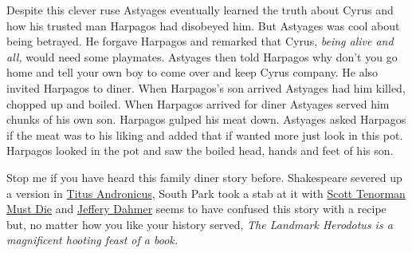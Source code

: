 Despite this clever ruse Astyages eventually learned the truth about
Cyrus and how his trusted man Harpagos had disobeyed him. But Astyages
was cool about being betrayed. He forgave Harpagos and remarked that
Cyrus, \emph{being alive and all,} would need some playmates. Astyages
then told Harpagos why don't you go home and tell your own boy to come
over and keep Cyrus company. He also invited Harpagos to diner. When
Harpagos's son arrived Astyages had him killed, chopped up and boiled.
When Harpagos arrived for diner Astyages served him chunks of his own
son. Harpagos gulped his meat down. Astyages asked Harpagos if the meat
was to his liking and added that if wanted more just look in this pot.
Harpagos looked in the pot and saw the boiled head, hands and feet of
his son.

Stop me if you have heard this family diner story before. Shakespeare
severed up a version in
\href{http://shakespeare.mit.edu/titus/full.html}{Titus Andronicus},
South Park took a stab at it with
\href{http://www.southparkstudios.com/guide/501}{Scott Tenorman Must
Die} and \href{http://en.wikipedia.org/wiki/Jeffrey\_Dahmer}{Jeffery
Dahmer} seems to have confused this story with a recipe but, no matter
how you like your history served, \emph{The Landmark Herodotus is a
magnificent hooting feast of a book.}




%